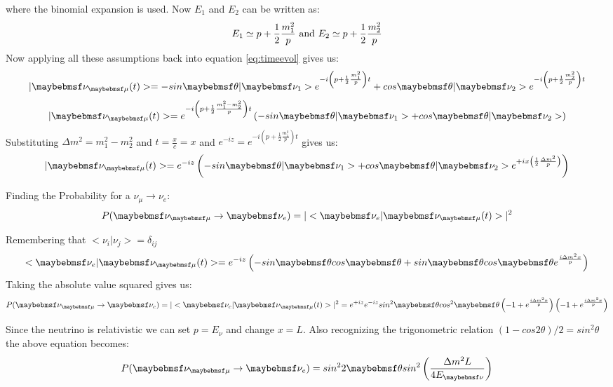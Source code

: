where the binomial expansion is used. Now $E_{1}$ and $E_{2}$ can be written as:
\begin{equation}
\centering
E_{1} \simeq p + \frac{1}{2}\frac{m^2_{1}}{p} \mbox{    and    }  E_{2} \simeq p + \frac{1}{2}\frac{m^2_{2}}{p}
\end{equation} 
Now applying all these assumptions back into equation \ref{eq:timeevol} gives us:
\begin{equation}
\centering
|\nu_{\mu}(t)> = -sin\theta|\nu_{1}>e^{-i\left( p+\frac{1}{2}\frac{m^2_{1}}{p}\right)t} + cos\theta|\nu_{2}>e^{-i\left(p+\frac{1}{2}\frac{m^2_{2}}{p}\right)t}
\end{equation}
\begin{equation}
\centering
|\nu_{\mu}(t)> = e^{-i \left( p+\frac{1}{2}\frac{m^2_{1}-m^2_{2}}{p} \right) t} \left( -sin\theta|\nu_{1}> + cos\theta|\nu_{2}> \right)
\end{equation}
 Substituting $\Delta m^2 = m^2_{1}-m^2_{2}$ and $t = \frac{x}{c} =x$ and $e^{-iz}= e^{-i \left( p+\frac{1}{2}\frac{m^2_{1}}{p} \right) t}$ gives us:
 \begin{equation}
 \centering
 |\nu_{\mu}(t)> = e^{-iz} \left( -sin\theta|\nu_{1}> + cos\theta|\nu_{2}>e^{+ix \left(\frac{1}{2}\frac{\Delta m^2}{p}\right)}\right)
 \end{equation}

Finding the Probability for a $\nu_{\mu} \rightarrow \nu_{e}$:
\begin{equation}
\centering
P(\nu_{\mu} \rightarrow \nu_{e}) = |<\nu_{e}|\nu_{\mu}(t)>|^2
\end{equation}

Remembering that $<\nu_{i}|\nu_{j}>=\delta_{ij}$
\begin{equation}
\centering
<\nu_{e}|\nu_{\mu}(t)> = e^{-iz}\left(-sin\theta cos\theta + sin\theta cos\theta e^{\frac{i \Delta m^2 x}{p}}\right)
\end{equation}
Taking the absolute value squared gives us:
\begin{equation}
\centering
P(\nu_{\mu} \rightarrow \nu_{e}) = |<\nu_{e}|\nu_{\mu}(t)>|^2 = e^{+iz}e^{-iz}sin^{2}\theta cos^{2}\theta\left( -1 + e^{\frac{i \Delta m^2 x}{p}}\right)\left(-1 + e^{\frac{i \Delta m^2 x}{p}}\right)
\end{equation}

Since the neutrino is relativistic we can set $p= E_{\nu}$ and change $x=L$. Also recognizing the trigonometric relation $(1 - cos2\theta)/2 = sin^{2}\theta$ the above equation becomes:
\begin{equation}
\centering
P(\nu_{\mu} \rightarrow \nu_{e}) = sin^{2}2\theta sin^2\left(\frac{\Delta m^2 L}{4 E_{\nu}}\right)
\end{equation}
 
